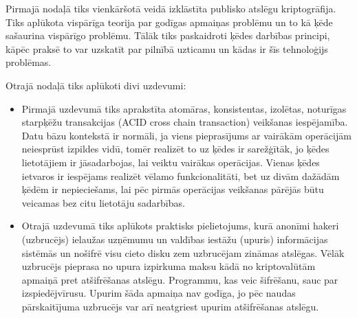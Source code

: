 Pirmajā nodaļā tiks vienkāršotā veidā izklāstīta publisko atslēgu kriptogrāfija. Tiks aplūkota vispārīga teorija par godīgas apmaiņas problēmu un to kā ķēde sašaurina vispārīgo problēmu. Tālāk tiks paskaidroti ķēdes darbības principi, kāpēc praksē to var uzskatīt par pilnībā uzticamu un kādas ir šīs tehnoloģijs problēmas.

Otrajā nodaļā tiks aplūkoti divi uzdevumi:
\begin{itemize}
    \item 
        Pirmajā uzdevumā tiks aprakstīta atomāras, konsistentas, izolētas, noturīgas starpķēžu transakcijas (ACID cross chain transaction) veikšanas iespējamība.\cite{back14,nolan13} Datu bāzu kontekstā ir normāli, ja viens pieprasījums ar vairākām operācijām neiesprūst izpildes vidū, tomēr realizēt to uz ķēdes ir sarežģītāk, jo ķēdes lietotājiem ir jāsadarbojas, lai veiktu vairākas operācijas. Vienas ķēdes ietvaros ir iespējams realizēt vēlamo funkcionalitāti, bet uz divām dažādām ķēdēm ir nepieciešams, lai pēc pirmās operācijas veikšanas pārējās būtu veicamas bez citu lietotāju sadarbības.
    \item
        Otrajā uzdevumā tiks aplūkots praktisks pielietojums, kurā anonīmi hakeri (uzbrucējs) ielaužas uzņēmumu un valdības iestāžu (upuris) informācijas sistēmās un nošifrē visu cieto disku zem uzbrucējam zināmas atslēgas.
        Vēlāk uzbrucējs pieprasa no upura izpirkuma maksu kādā no kriptovalūtām apmaiņā pret atšifrēšanas atslēgu. Programmu, kas veic šifrēšanu, sauc par izspiedējvīrusu.
Upurim šāda apmaiņa nav godīga, jo pēc naudas pārskaitījuma uzbrucējs var arī neatgriest upurim atšifrēšanas atslēgu. %
\end{itemize}

